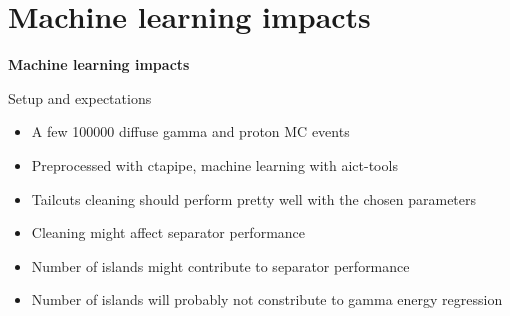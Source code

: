 
\section{Machine learning impacts}

\begin{frame}
    \centering
    {\Huge \textbf{Machine learning impacts}}
\end{frame}

\begin{frame}{Setup and expectations}
    \begin{itemize}
        \item A few \num{100000} diffuse gamma and proton MC events
        \item Preprocessed with ctapipe, machine learning with aict-tools \cite{Anderhub_2013}
        \item Tailcuts cleaning should perform pretty well with the chosen parameters
        \item Cleaning might affect separator performance
        \item Number of islands might contribute to separator performance
        \item Number of islands will probably not constribute to gamma energy regression
    \end{itemize}
\end{frame}

